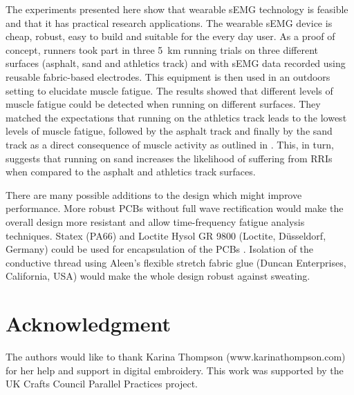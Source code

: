\documentclass[letterpaper, 10 pt, conference]{ieeeconf}
\begin{document}
The experiments presented here show that wearable sEMG technology is feasible
and that it has practical research applications. The wearable sEMG device is cheap, robust,
easy to build and suitable for the every day user. As a proof of concept, 
runners took part in three \SI{5}{\kilo\meter} running trials on three
different surfaces (asphalt, sand and athletics track) and with sEMG data recorded using reusable fabric-based electrodes. This equipment is then used in an outdoors setting to elucidate muscle fatigue. The results showed that
different levels of muscle fatigue could be detected when running on different
surfaces. They matched the expectations that running on the athletics track
leads to the lowest levels of muscle fatigue, followed by the asphalt track and
finally by the sand track as a direct consequence of muscle activity as outlined in \cite{pinnington2005kinematic}. This, in turn, suggests that running on sand
increases the likelihood of suffering from RRIs when compared to the asphalt
and athletics track surfaces.

There are many possible additions to the design
which might improve performance. More robust PCBs without full wave
rectification would make the overall design more resistant and allow time-frequency
fatigue analysis techniques. Statex (PA66) and Loctite Hysol GR 9800 (Loctite,
Düsseldorf, Germany) could be used for encapsulation of the PCBs
\cite{linz2005embroidering}. Isolation of the conductive thread using Aleen's
flexible stretch fabric glue (Duncan Enterprises, California, USA) would make
the whole design robust against sweating.








\section*{Acknowledgment}
The authors would like to thank Karina Thompson (www.karinathompson.com) for
her help and support in digital embroidery. This work was supported by the UK
Crafts Council Parallel Practices project.





\end{document}
